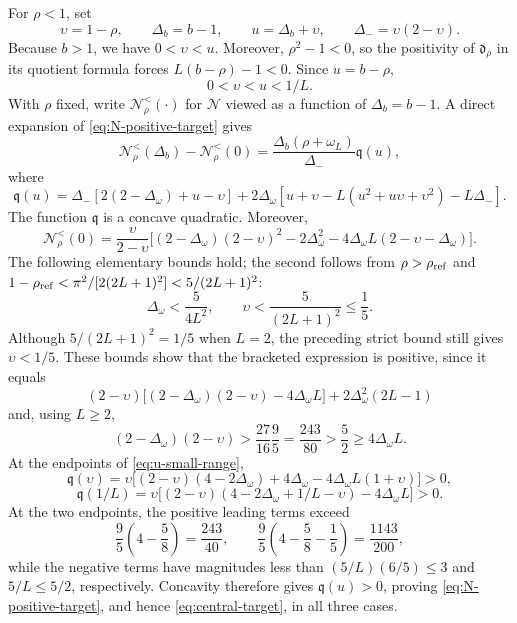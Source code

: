 \documentclass[a4paper,preprint,12pt,nopreprintline,sort&compress]{elsarticle}
\numberwithin{equation}{section}
\theoremstyle{remark}
\begin{document}
For \(\rho<1\), set
\[
 \upsilon=1-\rho,\qquad \Delta_b=b-1,\qquad
 u=\Delta_b+\upsilon,\qquad \Delta_-=\upsilon(2-\upsilon).
\]
Because \(b>1\), we have \(0<\upsilon<u\).  Moreover,
\(\rho^2-1<0\), so the positivity of \(\mathfrak d_\rho\) in its quotient
formula forces \(L(b-\rho)-1<0\).  Since \(u=b-\rho\),
\begin{equation}\label{eq:u-small-range}
 0<\upsilon<u<1/L.
\end{equation}
With \(\rho\) fixed, write \(\mathcal N_\rho^{<}(\mathord\cdot)\) for
\(\mathcal N\) viewed as a function of \(\Delta_b=b-1\).
A direct expansion of \eqref{eq:N-positive-target} gives
\[
 \mathcal N_\rho^{<}(\Delta_b)-\mathcal N_\rho^{<}(0)
 =\frac{\Delta_b(\rho+\omega_L)}{\Delta_-}\mathfrak q(u),
\]
where
\[
 \mathfrak q(u)=\Delta_-[2(2-\Delta_\omega)+u-\upsilon]
 +2\Delta_\omega
 [u+\upsilon-L(u^2+u\upsilon+\upsilon^2)-L\Delta_-].
\]
The function \(\mathfrak q\) is a concave quadratic.  Moreover,
\[
 \mathcal N_\rho^{<}(0)=\frac{\upsilon}{2-\upsilon}
 \bigl[(2-\Delta_\omega)(2-\upsilon)^2
 -2\Delta_\omega^2
 -4\Delta_\omega L(2-\upsilon-\Delta_\omega)\bigr].
\]
The following elementary bounds hold; the second follows from
\(\rho>\rho_{\rm ref}\) and
\(1-\rho_{\rm ref}<\pi^2/[2(2L+1)^2]<5/(2L+1)^2\):
\begin{equation}\label{eq:Delta-upsilon-bounds}
 \Delta_\omega<\frac5{4L^2},\qquad
 \upsilon<\frac5{(2L+1)^2}\leq\frac15.
\end{equation}
Although \(5/(2L+1)^2=1/5\) when \(L=2\), the preceding strict bound still
gives \(\upsilon<1/5\).  These bounds
show that the bracketed expression is positive, since it equals
\[
 (2-\upsilon)
 \bigl[(2-\Delta_\omega)(2-\upsilon)-4\Delta_\omega L\bigr]
 +2\Delta_\omega^2(2L-1)
\]
and, using \(L\geq2\),
\[
 (2-\Delta_\omega)(2-\upsilon)
 >\frac{27}{16}\frac95=\frac{243}{80}
 >\frac52\geq4\Delta_\omega L.
\]
At the endpoints of
\eqref{eq:u-small-range},
\[
 \mathfrak q(\upsilon)=\upsilon
 \bigl[(2-\upsilon)(4-2\Delta_\omega)
 +4\Delta_\omega-4\Delta_\omega L(1+\upsilon)\bigr]>0,
\]
\[
 \mathfrak q(1/L)=\upsilon
 \bigl[(2-\upsilon)(4-2\Delta_\omega+1/L-\upsilon)
 -4\Delta_\omega L\bigr]>0.
\]
At the two endpoints, the positive leading terms exceed
\[
 \frac95\left(4-\frac58\right)=\frac{243}{40},
 \qquad
 \frac95\left(4-\frac58-\frac15\right)=\frac{1143}{200},
\]
while the negative terms have magnitudes less than
\((5/L)(6/5)\leq3\) and \(5/L\leq5/2\), respectively.  Concavity therefore
gives \(\mathfrak q(u)>0\), proving \eqref{eq:N-positive-target}, and hence
\eqref{eq:central-target}, in all three cases.
\end{document}
